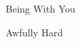 \newcommand{\chaptera}{../../poem/being_with_you.tex}
\begin{poem}{Being With You}{}

\end{poem}

\newcommand{\chapterb}{../../poem/awfully_hard.tex}
\begin{poem}{Awfully Hard}{}

\end{poem}

